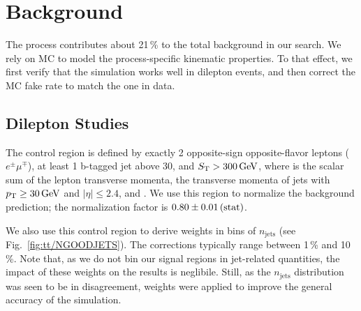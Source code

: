 \section{\texorpdfstring{\ttbar}{TTbar} Background}
\label{sec:bkg_tt}

The \ttbar process contributes about 21\,\% to the total background in our search. We rely on MC to model the process-specific kinematic properties. To that effect, we first verify that the simulation works well in dilepton events, and then correct the MC fake rate to match the one in data.

\subsection{Dilepton Studies}
The \ttbar control region is defined by exactly 2 opposite-sign opposite-flavor leptons ($e^\pm \mu^\mp$), at least 1 b-tagged jet above 30\GeV, and $S_{\mathrm{T}} > 300\,\text{Ge\hspace{-.08em}V}$, where \ST is the scalar sum of the lepton transverse momenta, the transverse momenta of jets with $p_{\mathrm{T}} \geq 30\,\text{Ge\hspace{-.08em}V}$ and $|\eta| \leq 2.4$, and \MET. We use this region to normalize the background prediction; the normalization factor is $0.80 \pm 0.01\,\text{(stat)}$.

We also use this control region to derive weights in bins of $n_\textrm{jets}$ (see Fig.~\ref{fig:tt/NGOODJETS}). The corrections typically range between 1\,\% and 10\,\%. Note that, as we do not bin our signal regions in jet-related quantities, the impact of these weights on the results is neglibile. Still, as the $n_\textrm{jets}$ distribution was seen to be in disagreement, weights were applied to improve the general accuracy of the simulation.

